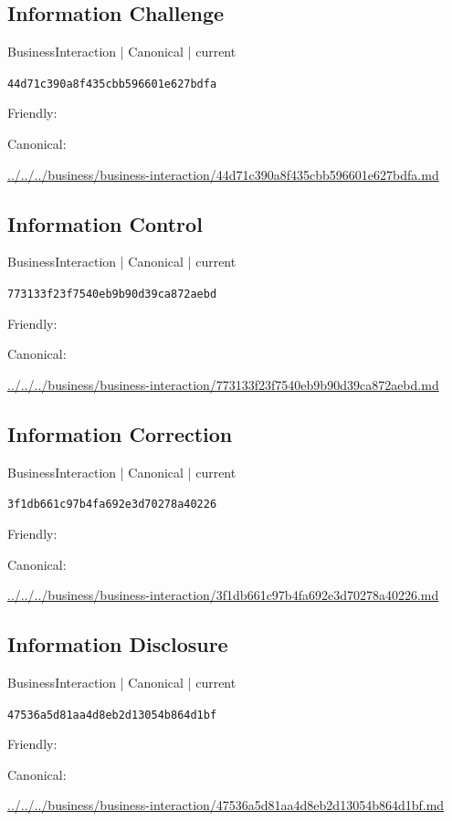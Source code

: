 \documentclass[10pt,a4paper]{article}
\begin{document}
\subsection*{Information Challenge}
{\small BusinessInteraction | Canonical | current}\par
\texttt{44d71c390a8f435cbb596601e627bdfa}\par
Friendly: \par
Canonical: \par
{\footnotesize\url{../../../business/business-interaction/44d71c390a8f435cbb596601e627bdfa.md}}\par
\subsection*{Information Control}
{\small BusinessInteraction | Canonical | current}\par
\texttt{773133f23f7540eb9b90d39ca872aebd}\par
Friendly: \par
Canonical: \par
{\footnotesize\url{../../../business/business-interaction/773133f23f7540eb9b90d39ca872aebd.md}}\par
\subsection*{Information Correction}
{\small BusinessInteraction | Canonical | current}\par
\texttt{3f1db661c97b4fa692e3d70278a40226}\par
Friendly: \par
Canonical: \par
{\footnotesize\url{../../../business/business-interaction/3f1db661c97b4fa692e3d70278a40226.md}}\par
\subsection*{Information Disclosure}
{\small BusinessInteraction | Canonical | current}\par
\texttt{47536a5d81aa4d8eb2d13054b864d1bf}\par
Friendly: \par
Canonical: \par
{\footnotesize\url{../../../business/business-interaction/47536a5d81aa4d8eb2d13054b864d1bf.md}}\par
\end{document}
